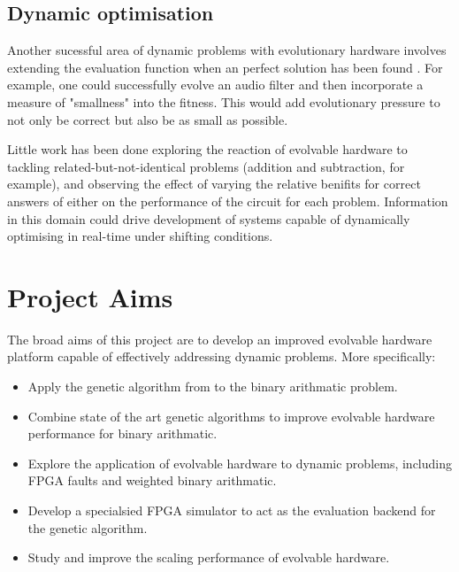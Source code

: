 \subsection{Dynamic optimisation}
Another sucessful area of dynamic problems with evolutionary hardware involves
extending the evaluation function when an perfect solution has been found \cite{785435}. For example,
one could successfully evolve an audio filter and then incorporate a measure of "smallness"
into the fitness. This would add evolutionary pressure to not only be correct but also
be as small as possible.

Little work has been done exploring the reaction of evolvable hardware to tackling
related-but-not-identical problems (addition and subtraction, for example), and observing
the effect of varying
the relative benifits for correct answers of either on the performance of the circuit for each problem.
Information in this domain could
drive development of systems capable of dynamically optimising in real-time
under shifting conditions.

\section{Project Aims}

The broad aims of this project are to develop an improved evolvable hardware
platform capable of effectively addressing dynamic problems. More specifically:
\begin{itemize}
	\item Apply the genetic algorithm from \cite{10.1007/3-540-63173-9_61} to
		the binary arithmatic problem.
	\item Combine state of the art genetic algorithms to improve
		evolvable hardware performance for binary arithmatic.
	\item Explore the application of evolvable hardware to dynamic
		problems, including FPGA faults and weighted binary arithmatic.
	\item Develop a specialsied FPGA simulator to act as the evaluation
		backend for the genetic algorithm.
	\item Study and improve the scaling performance of evolvable hardware.
\end{itemize}

